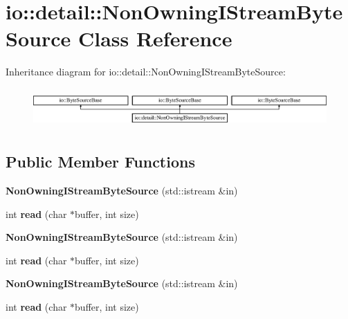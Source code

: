 \hypertarget{classio_1_1detail_1_1_non_owning_i_stream_byte_source}{}\section{io\+:\+:detail\+:\+:Non\+Owning\+I\+Stream\+Byte\+Source Class Reference}
\label{classio_1_1detail_1_1_non_owning_i_stream_byte_source}
Inheritance diagram for io\+:\+:detail\+:\+:Non\+Owning\+I\+Stream\+Byte\+Source\+:\begin{figure}[H]
\begin{center}
\leavevmode
\includegraphics[height=1.517615cm]{d1/d55/classio_1_1detail_1_1_non_owning_i_stream_byte_source}
\end{center}
\end{figure}
\subsection*{Public Member Functions}
\begin{DoxyCompactItemize}
\item 
\mbox{\label{classio_1_1detail_1_1_non_owning_i_stream_byte_source_aacb55ba2f52ba1c30810697d6aa92169}} 
{\bfseries Non\+Owning\+I\+Stream\+Byte\+Source} (std\+::istream \&in)
\item 
\mbox{\label{classio_1_1detail_1_1_non_owning_i_stream_byte_source_ac7b1968c8314896d7ec0ebb97fdda30d}} 
int {\bfseries read} (char $\ast$buffer, int size)
\item 
\mbox{\label{classio_1_1detail_1_1_non_owning_i_stream_byte_source_aacb55ba2f52ba1c30810697d6aa92169}} 
{\bfseries Non\+Owning\+I\+Stream\+Byte\+Source} (std\+::istream \&in)
\item 
\mbox{\label{classio_1_1detail_1_1_non_owning_i_stream_byte_source_ac7b1968c8314896d7ec0ebb97fdda30d}} 
int {\bfseries read} (char $\ast$buffer, int size)
\item 
\mbox{\label{classio_1_1detail_1_1_non_owning_i_stream_byte_source_aacb55ba2f52ba1c30810697d6aa92169}} 
{\bfseries Non\+Owning\+I\+Stream\+Byte\+Source} (std\+::istream \&in)
\item 
\mbox{\label{classio_1_1detail_1_1_non_owning_i_stream_byte_source_ac7b1968c8314896d7ec0ebb97fdda30d}} 
int {\bfseries read} (char $\ast$buffer, int size)
\end{DoxyCompactItemize}


